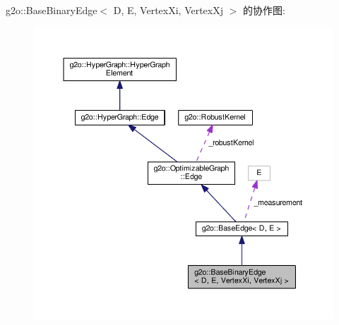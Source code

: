 g2o\-:\-:Base\-Binary\-Edge$<$ D, E, Vertex\-Xi, Vertex\-Xj $>$ 的协作图\-:
\nopagebreak
\begin{figure}[H]
\begin{center}
\leavevmode
\includegraphics[width=350pt]{classg2o_1_1BaseBinaryEdge__coll__graph}
\end{center}
\end{figure}
